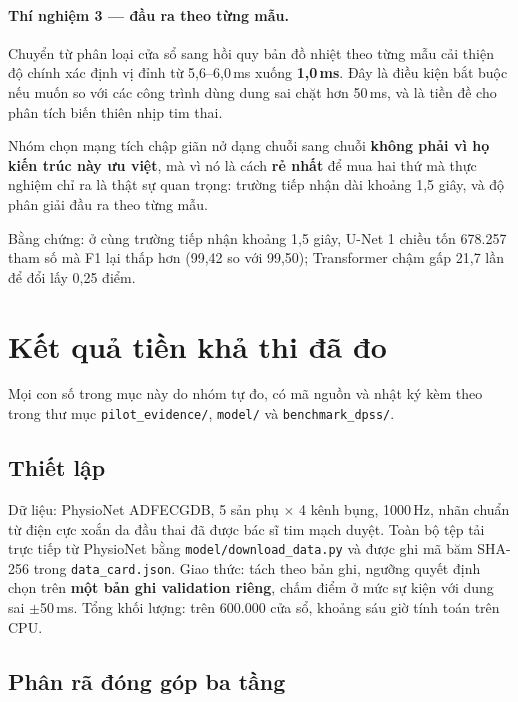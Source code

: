\paragraph{Thí nghiệm 3 --- đầu ra theo từng mẫu.}
Chuyển từ phân loại cửa sổ sang hồi quy bản đồ nhiệt theo từng mẫu cải thiện độ chính xác định vị đỉnh
từ 5,6--6,0\,ms xuống \textbf{1,0\,ms}. Đây là điều kiện bắt buộc nếu muốn so với các công trình dùng
dung sai chặt hơn 50\,ms, và là tiền đề cho phân tích biến thiên nhịp tim thai.

\begin{ghichu}[title={Kết luận về lựa chọn mô hình}]
Nhóm chọn mạng tích chập giãn nở dạng chuỗi sang chuỗi \textbf{không phải vì họ kiến trúc này ưu việt},
mà vì nó là cách \textbf{rẻ nhất} để mua hai thứ mà thực nghiệm chỉ ra là thật sự quan trọng:
trường tiếp nhận dài khoảng 1,5 giây, và độ phân giải đầu ra theo từng mẫu.

Bằng chứng: ở cùng trường tiếp nhận khoảng 1,5 giây, U-Net 1 chiều tốn 678.257 tham số mà F1 lại thấp
hơn (99,42 so với 99,50); Transformer chậm gấp 21,7 lần để đổi lấy 0,25 điểm.
\end{ghichu}

\clearpage

\section{Kết quả tiền khả thi đã đo}
\label{sec:ketqua}

Mọi con số trong mục này do nhóm tự đo, có mã nguồn và nhật ký kèm theo trong thư mục
\texttt{pilot\_evidence/}, \texttt{model/} và \texttt{benchmark\_dpss/}.

\subsection{Thiết lập}

Dữ liệu: PhysioNet ADFECGDB, 5 sản phụ $\times$ 4 kênh bụng, 1000\,Hz, nhãn chuẩn từ điện cực xoắn da đầu
thai đã được bác sĩ tim mạch duyệt. Toàn bộ tệp tải trực tiếp từ PhysioNet bằng
\texttt{model/download\_data.py} và được ghi mã băm SHA-256 trong \texttt{data\_card.json}.
Giao thức: tách theo bản ghi, ngưỡng quyết định chọn trên \textbf{một bản ghi validation riêng},
chấm điểm ở mức sự kiện với dung sai $\pm$50\,ms. Tổng khối lượng: trên 600.000 cửa sổ, khoảng sáu giờ
tính toán trên CPU.

\subsection{Phân rã đóng góp ba tầng}

